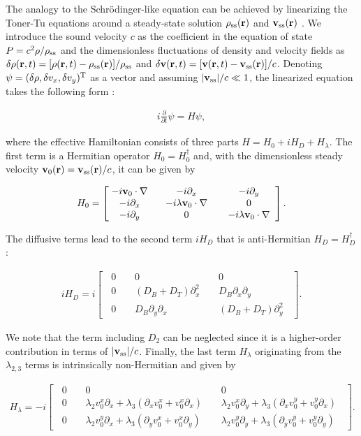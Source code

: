 \documentclass{tADP2e}
\theoremstyle{plain}
\newcommand{\eqn}[1]{
\begin{eqnarray}
	#1
\end{eqnarray}
}
\theoremstyle{plain}
\theoremstyle{definition}
\begin{document}
The analogy to the Schr{\"o}dinger-like equation can be achieved by linearizing the Toner-Tu equations around a steady-state solution $\rho_{\rm ss}({\bf r})$ and ${\bf v}_{\rm ss}({\bf r})$ \cite{Souslov2018,SK19}. We introduce the sound velocity $c$ as the coefficient in the equation of state $P=c^2\rho/\rho_{\rm ss}$ and the dimensionless fluctuations of density and velocity fields as $\delta\rho({\bf r},t)=[\rho({\bf r},t)-\rho_{\rm ss}({\bf r})]/\rho_{\rm ss}$ and $\delta{\bf v}({\bf r},t)=[{\bf v}({\bf r},t)-{\bf v}_{\rm ss}({\bf r})]/c$. Denoting $\psi=(\delta\rho,\delta v_{x},\delta v_{y})^{\rm T}$ as a vector and assuming $|{\bf v}_{\rm ss}|/c\ll 1$, the linearized equation takes the following form \cite{SK19}:
\eqn{
i\frac{\partial}{\partial t}\psi={ H}\psi,
} 
where the effective Hamiltonian consists of three parts ${ H}=H_0+iH_D+H_\lambda$. The first term is a Hermitian operator $H_0=H_0^\dagger$ and, with the dimensionless steady velocity ${\bf v}_0({\bf r})={\bf v}_{\rm ss}({\bf r})/c$, it can be given by
\eqn{
H_0=
\begin{bmatrix}
\;-i{\bf v}_{0}\cdot\nabla\; & \;\; -i\partial_x\;\; & \;\;-i\partial_y\;\; \\
\;-i\partial_x\; & \;\;-i\lambda{\bf v}_{0}\cdot\nabla\;\; & \;\;0\;\; \\
\;-i\partial_y\; & \;\;0\;\; & \;\;-i\lambda{\bf v}_{0}\cdot\nabla\;\;
\end{bmatrix}.
} 
The diffusive terms lead to the second term $iH_D$ that is anti-Hermitian  $H_D=H_D^\dagger$:
\eqn{
iH_D=i
\begin{bmatrix}
\;\;0\;\; & \;\;0\;\; & \;\;0\;\; \\
\;\;0\;\; & \;\;(D_B+D_T)\partial_x^2\;\; & \;\;D_B\partial_x\partial_y\;\; \\
\;\;0\;\; & \;\;D_B\partial_y\partial_x\;\; & \;\;(D_B+D_T)\partial_y^2\;\;
\end{bmatrix}.
}
We note that the term including $D_2$ can be neglected since it is a higher-order contribution in terms of $|{\bf v}_{\rm ss}|/c$.
Finally, the last term $H_\lambda$ originating from the $\lambda_{2,3}$ terms is intrinsically non-Hermitian and given by
\eqn{
H_\lambda=-i
\begin{bmatrix}
\;\;0\;\; & \;\;0\;\; & \;\;0\;\; \\
\;\;0\;\; & \;\;\lambda_2v_0^x\partial_x+\lambda_3(\partial_x v_0^x+v_0^x\partial_x)\;\; & \;\;\lambda_2v_0^x\partial_y+\lambda_3(\partial_xv_0^y+v_0^y\partial_x)\;\; \\
\;\;0\;\; & \;\;\lambda_2v_0^y\partial_x+\lambda_3(\partial_yv_0^x+v_0^x\partial_y)\;\; & \;\;\lambda_2v_0^y\partial_y+\lambda_3(\partial_yv_0^y+v_0^y\partial_y)\;\;
\end{bmatrix}.
}
\end{document}
